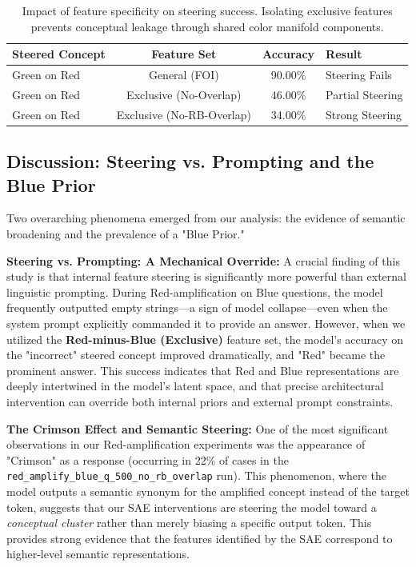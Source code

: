 \begin{table}[h]
\centering
\begin{tabular}{|l|c|c|l|}
\hline
\textbf{Steered Concept} & \textbf{Feature Set} & \textbf{Accuracy} & \textbf{Result} \\
\hline
Green on Red & General (FOI) & 90.00\% & Steering Fails \\
Green on Red & Exclusive (No-Overlap) & 46.00\% & Partial Steering \\
Green on Red & Exclusive (No-RB-Overlap) & 34.00\% & Strong Steering \\
\hline
\end{tabular}
\caption{Impact of feature specificity on steering success. Isolating exclusive features prevents conceptual leakage through shared color manifold components.}
\label{tab:specificity}
\end{table}

\subsection{Discussion: Steering vs. Prompting and the Blue Prior}
Two overarching phenomena emerged from our analysis: the evidence of semantic broadening and the prevalence of a "Blue Prior."

\textbf{Steering vs. Prompting: A Mechanical Override:} A crucial finding of this study is that internal feature steering is significantly more powerful than external linguistic prompting. During Red-amplification on Blue questions, the model frequently outputted empty strings—a sign of model collapse—even when the system prompt explicitly commanded it to provide an answer. However, when we utilized the \textbf{Red-minus-Blue (Exclusive)} feature set, the model's accuracy on the "incorrect" steered concept improved dramatically, and "Red" became the prominent answer. This success indicates that Red and Blue representations are deeply intertwined in the model's latent space, and that precise architectural intervention can override both internal priors and external prompt constraints.

\textbf{The Crimson Effect and Semantic Steering:} One of the most significant observations in our Red-amplification experiments was the appearance of "Crimson" as a response (occurring in 22\% of cases in the \texttt{red\_amplify\_blue\_q\_500\_no\_rb\_overlap} run). This phenomenon, where the model outputs a semantic synonym for the amplified concept instead of the target token, suggests that our SAE interventions are steering the model toward a \textit{conceptual cluster} rather than merely biasing a specific output token. This provides strong evidence that the features identified by the SAE correspond to higher-level semantic representations.

